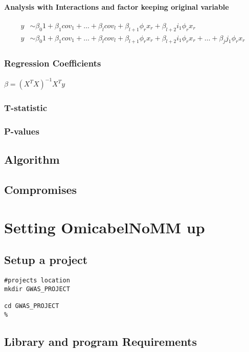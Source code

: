 \documentclass{report}
\begin{document}
\subsubsection{Analysis with Interactions and factor keeping original variable}
\begin{align}
y &\sim\beta_0 1 + \beta_1 cov_1 + \dots + \beta_l cov_l +  \beta_{l+1} \phi_{r} x_r +  \beta_{l+2} i_1 \phi_{r} x_r\\
y &\sim \beta_0 1 + \beta_1 cov_1 + \dots + \beta_l cov_l + \beta_{l+1} \phi_{r} x_r + \beta_{l+2} i_1 \phi_{r} x_r + \dots  + \beta_j j_1 \phi_{r} x_r
\end{align}


\subsection{Regression Coefficients}

$\beta=(X^T X)^{-1} X^T y$

\subsection{T-statistic}
\subsection{P-values}


\section{Algorithm}

\section{Compromises}

\chapter{Setting OmicabelNoMM up}

\section{Setup a project}
\begin{lstlisting}[style=BASH,escapechar=\%]
#projects location
mkdir GWAS_PROJECT

cd GWAS_PROJECT
%
\end{lstlisting}

\section{Library and program Requirements}
\end{document}
